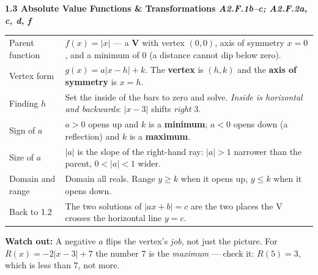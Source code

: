 \documentclass[10pt]{article}
\newcommand{\sghead}[2]{%
  \boxguard[10]%
  \vspace{4pt}\par\noindent
  \colorbox{forest}{\parbox{\dimexpr\linewidth-2\fboxsep}{%
    \small\color{white}\bfseries #1 \hfill \textmd{\itshape\scriptsize\color{forestmid} #2}}}%
  \vspace{2pt}\par}
\newcommand{\sgwatch}[1]{%
  \vspace{1pt}\par\noindent
  \colorbox{redbg}{\parbox{\dimexpr\linewidth-2\fboxsep}{%
    \footnotesize\textbf{\textcolor{redacc}{Watch out:}} #1}}%
  \vspace{1pt}\par}
\newcommand{\sgtabsetup}{\renewcommand{\arraystretch}{1.06}\footnotesize}
\begin{document}
\sghead{1.3 \quad Absolute Value Functions \& Transformations}{A2.F.1b--c; A2.F.2a, c, d, f}
{\sgtabsetup
\begin{tabularx}{\linewidth}{@{} G X @{}}
Parent function & $f(x)=|x|$ --- a \textbf{V} with vertex $(0,0)$, axis of symmetry $x=0$, and a
  minimum of $0$ (a distance cannot dip below zero). \\
Vertex form & $g(x)=a|x-h|+k$. The \textbf{vertex} is $(h,k)$ and the \textbf{axis of symmetry}
  is $x=h$. \\
Finding $h$ & Set the inside of the bars to zero and solve. \emph{Inside is horizontal and
  backwards}: $|x-3|$ shifts \emph{right} $3$. \\
Sign of $a$ & $a>0$ opens up and $k$ is a \textbf{minimum}; $a<0$ opens down (a reflection) and
  $k$ is a \textbf{maximum}. \\
Size of $a$ & $|a|$ is the slope of the right-hand ray: $|a|>1$ narrower than the parent,
  $0<|a|<1$ wider. \\
Domain and range & Domain all reals. Range $y\ge k$ when it opens up, $y\le k$ when it opens
  down. \\
Back to 1.2 & The two solutions of $|ax+b|=c$ are the two places the V crosses the horizontal
  line $y=c$. \\
\end{tabularx}}
\sgwatch{A negative $a$ flips the vertex's \emph{job}, not just the picture. For
$R(x)=-2|x-3|+7$ the number $7$ is the \emph{maximum} --- check it: $R(5)=3$, which is less
than $7$, not more.}
\end{document}
